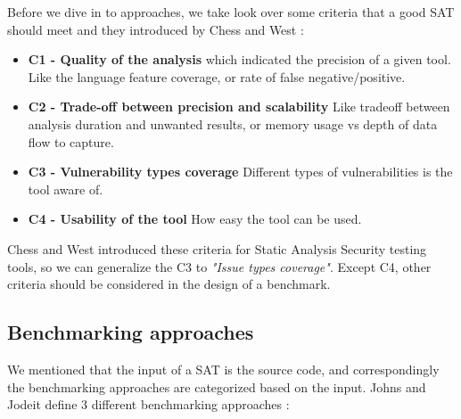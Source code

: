 \documentclass[authoryear,preprint]{sigplanconf}
\begin{document}
Before we dive in to approaches, we take look over some criteria that a good SAT should meet and they introduced by Chess and West \cite{Chess:2007:SPS:1406221}:

\begin{itemize}
	\item \textbf{C1 - Quality of the analysis} which indicated the precision of a given tool. Like the language feature coverage, or rate of false negative/positive.
	\item \textbf{C2 - Trade-off between precision and scalability} Like tradeoff between analysis duration and unwanted results, or memory usage vs depth of data flow to capture. 
	\item \textbf{C3 - Vulnerability types coverage} Different types of vulnerabilities is the tool aware of. 
	\item \textbf{C4 - Usability of the tool} How easy the tool can be used.
\end{itemize}

Chess and West introduced these criteria for Static Analysis Security testing tools, so we can generalize the C3 to \textit{"Issue types coverage"}. Except C4, other criteria should be considered in the design of a benchmark. 

\subsection{Benchmarking approaches}

We mentioned that the input of a SAT is the source code, and correspondingly the benchmarking approaches are categorized based on the input. Johns and Jodeit define 3 different benchmarking approaches \cite{Scanstud}: 
\end{document}
